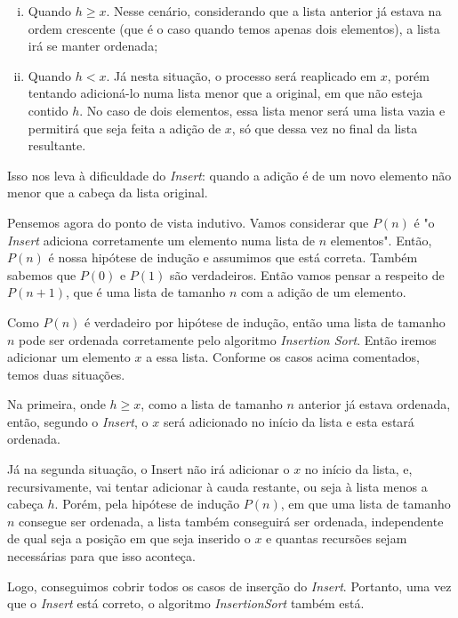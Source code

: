 \documentclass[a4paper, 10pt]{article}
\begin{document}
\begin{enumerate}[i)]
	\item Quando $h \geq x$. Nesse cenário, considerando que a lista anterior já estava na ordem crescente (que é o caso quando temos apenas dois elementos), a lista irá se manter ordenada;
    \item Quando $h < x$. Já nesta situação, o processo será reaplicado em $x$, porém tentando adicioná-lo numa lista menor que a original, em que não esteja contido $h$. No caso de dois elementos, essa lista menor será uma lista vazia e permitirá que seja feita a adição de $x$, só que dessa vez no final da lista resultante.
\end{enumerate}

Isso nos leva à dificuldade do \textit{Insert}: quando a adição é de um novo elemento não menor que a cabeça da lista original. 

Pensemos agora do ponto de vista indutivo. Vamos considerar que $P(n)$ é "o \textit{Insert} adiciona corretamente um elemento numa lista de $n$ elementos". Então, $P(n)$ é nossa hipótese de indução e assumimos que está correta. Também sabemos que $P(0)$ e $P(1)$ são verdadeiros. Então vamos pensar a respeito de $P(n+1)$, que é uma lista de tamanho $n$ com a adição de um elemento.

Como $P(n)$ é verdadeiro por hipótese de indução, então uma lista de tamanho $n$ pode ser ordenada corretamente pelo algoritmo \textit{Insertion Sort}. Então iremos adicionar um elemento $x$ a essa lista. Conforme os casos acima comentados, temos duas situações.

Na primeira, onde $h \geq x$, como a lista de tamanho $n$ anterior já estava ordenada, então, segundo o \textit{Insert}, o $x$ será adicionado no início da lista e esta estará ordenada.

Já na segunda situação, o Insert não irá adicionar o $x$ no início da lista, e, recursivamente, vai tentar adicionar à cauda restante, ou seja à lista menos a cabeça $h$. Porém, pela hipótese de indução $P(n)$, em que uma lista de tamanho $n$ consegue ser ordenada, a lista também conseguirá ser ordenada, independente de qual seja a posição em que seja inserido o $x$ e quantas recursões sejam necessárias para que isso aconteça.

Logo, conseguimos cobrir todos os casos de inserção do \textit{Insert}. Portanto, uma vez que o \textit{Insert} está correto, o algoritmo \textit{InsertionSort} também está.
\end{document}
